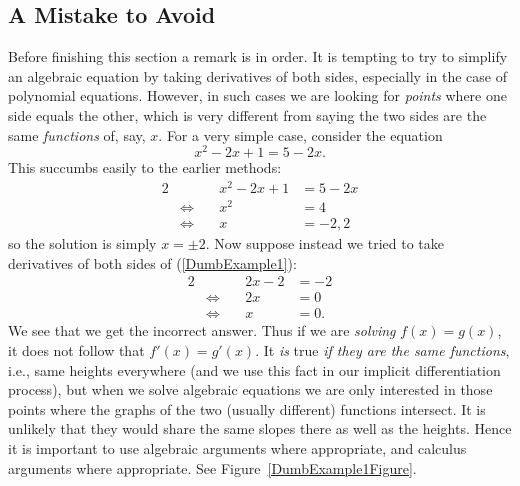 \subsection{A Mistake to Avoid}
Before finishing this section a remark is in order.
It is tempting to try to simplify an algebraic
equation by taking derivatives of both sides, especially
in the case of polynomial equations.  However,
in such cases we are looking for {\it points} where
one side equals the other, which is very different
from saying the two sides are the same {\it functions}
of, say, $x$.
For a very simple case, consider the equation
\begin{equation}x^2-2x+1=5-2x.\label{DumbExample1}\end{equation}
This succumbs easily to the earlier methods:
\begin{alignat*}{2}&\qquad&x^2-2x+1&=5-2x\\&\iff& x^2&=4\\
&\iff& x&=-2,2\end{alignat*}
so the solution is simply $x=\pm2$.  Now suppose instead we
tried to take derivatives of both sides of (\ref{DumbExample1}):
\begin{alignat*}{2}
&\qquad&2x-2&=-2\\ &\iff& 2x&=0\\ &\iff& x&=0.\end{alignat*}
We see that we get the incorrect answer.  Thus if we
are {\it solving} $f(x)=g(x)$, it does not follow that
$f'(x)=g'(x)$.  It {\it is} true {\it if they are the
same functions}, i.e., same heights everywhere
(and we use this fact in our implicit differentiation
process), but
when we solve algebraic equations we are only interested
in those points where the graphs of the two
(usually different) functions intersect.
It is unlikely that they would share the  same slopes there
as well as the heights. Hence it is important to 
use algebraic arguments where appropriate, and calculus
arguments where appropriate.
See Figure~\ref{DumbExample1Figure}.
